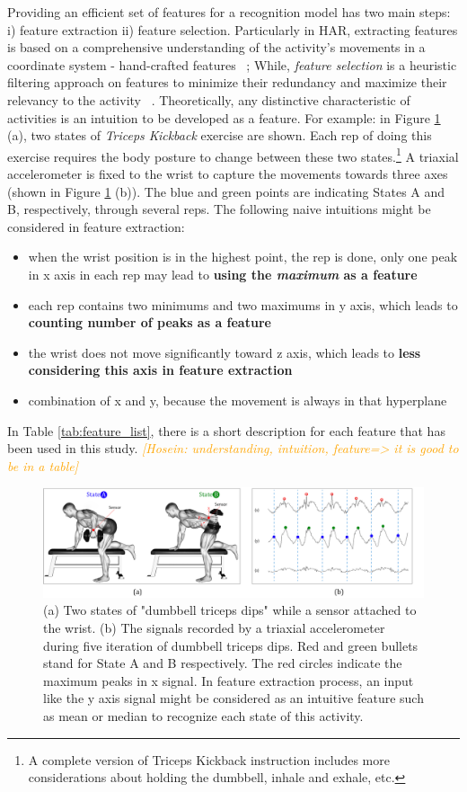 \documentclass[journal,article,submit,moreauthors,pdftex]{Definitions/mdpi}
\newcommand{\hosein}[1]{\textcolor{orange}{{\it [Hosein: #1]}}}
\begin{document}
Providing an efficient set of features for a recognition model has two main steps: i) feature extraction ii) feature selection. Particularly in HAR, extracting features is based on a comprehensive understanding of the activity's movements in a coordinate system - hand-crafted features ~\cite{}; While, \textit{feature selection} is a heuristic filtering approach on features to minimize their redundancy and maximize their relevancy to the activity ~\cite{}. Theoretically, any distinctive characteristic of activities is an intuition to be developed as a feature. For example: in Figure \ref{fig:feature_intuition} (a), two states of \textit{Triceps Kickback} exercise are shown. Each rep of doing this exercise requires the body posture to change between these two states.\footnote{A complete version of Triceps Kickback instruction includes more considerations about holding the dumbbell, inhale and exhale, etc.} A triaxial accelerometer is fixed to the wrist to capture the movements towards three axes (shown in Figure \ref{fig:feature_intuition} (b)). The blue and green points are indicating States A and B, respectively, through several reps. The following naive intuitions might be considered in feature extraction:
\begin{itemize}
	\item when the wrist position is in the highest point, the rep is done, only one peak in x axis in each rep may lead to \textbf{using the \textit{maximum} as a feature}
	\item each rep contains two minimums and two maximums in y axis, which leads to \textbf{counting number of peaks as a feature}
	\item the wrist does not move significantly toward z axis, which leads to \textbf{less considering this axis in feature extraction}
	\item combination of x and y, because the movement is always in that hyperplane
	
\end{itemize}
In Table \ref{tab:feature_list}, there is a short description for each feature that has been used in this study.
\hosein{understanding, intuition, feature=> it is good to be in a table}
\begin{figure}[H]
	\centering
	\includegraphics[width=14 cm]{Definitions/images/hand_craft_intuition.jpg}
	\caption{(a) Two states of "dumbbell triceps dips" while a sensor attached to the wrist. (b) The signals recorded by a triaxial accelerometer during five iteration of dumbbell triceps dips. Red and green bullets stand for State A and B respectively. The red circles indicate the maximum peaks in x signal. In feature extraction process, an input like the y axis signal might be considered as an intuitive feature such as mean or median to recognize each state of this activity.}
	\label{fig:feature_intuition}
\end{figure} 
\end{document}
